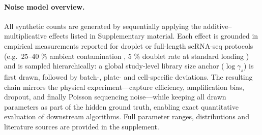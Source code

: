 \documentclass{article}
\begin{document}
\paragraph{Noise model overview.}
All synthetic counts are generated by sequentially applying the
additive–multiplicative effects listed in Supplementary material.  Each effect is grounded in empirical
measurements reported for droplet or full-length scRNA-seq protocols
(e.g.\ 25–40 \% ambient contamination \cite{Young2020}, 5 \% doublet
rate at standard loading \cite{Zheng2017}) and is sampled
hierarchically: a global study-level library size anchor
($\log\gamma_s$) is first drawn, followed by batch-,
plate- and cell-specific deviations.  The resulting chain
mirrors the physical experiment—capture efficiency, amplification
bias, dropout, and finally Poisson sequencing noise—while keeping all
drawn parameters as part of the hidden ground truth, enabling exact
quantitative evaluation of downstream algorithms.  Full parameter
ranges, distributions and literature sources are provided in the
supplement.
\end{document}
